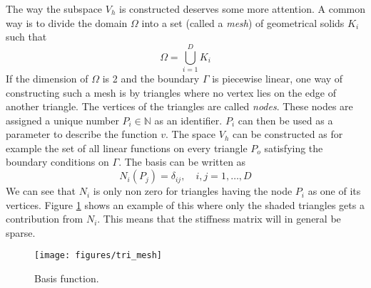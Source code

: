 \documentclass[fem.tex]{subfiles}
\begin{document}
The way the subspace $V_h$ is constructed deserves some more attention.   A common way is to divide the domain $\Omega$ into a set (called a \textit{mesh})  of geometrical solids $K_i$ such that
%
\begin{equation} 
    \Omega = \bigcup_{i = 1}^D K_i
\end{equation}
%
If the dimension of $\Omega$ is 2 and the boundary $\Gamma$ is piecewise linear, one way of constructing such a mesh is by triangles where no vertex lies on the edge of another triangle. The vertices of the triangles are called \textit{nodes}. These nodes are assigned a unique number $P_i \in \mathbb{N}$ as an identifier. $P_i$ can then be used as a parameter to describe the function $v$. The space $V_h$ can be constructed as for example the set of all linear functions on every triangle $P_o$ satisfying the boundary conditions on $\Gamma$. The basis can be written as
%
\begin{equation} 
    N_i(P_j) = \delta_{ij}, \quad i,j = 1,\ldots, D
\end{equation}
%
We can see that $N_i$ is only non zero for triangles having the node $P_i$ as one of its vertices. Figure \ref{fig:tri_mesh} shows an example of this where only the shaded triangles gets a contribution from $N_i$. This means that the stiffness matrix will in general be sparse. 

\begin{figure}[ht]
\centering
\texttt{[image: figures/tri\_mesh]}
\caption{Basis function.}
\label{fig:tri_mesh}
\end{figure}
\end{document}
